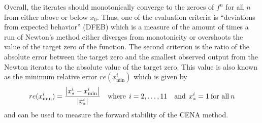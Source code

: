 \documentclass{standalone}
\begin{document}
	Overall, the iterates should monotonically converge to the zeroes of $f^{n}$ for all $n$ from either above or below $x_{0}$. Thus, one of the evaluation criteria is ``deviations from expected behavior'' (DFEB) which is a measure of the amount of times a run of Newton's method either diverges from monotonicity or overshoots the value of the target zero of the function. The second criterion is the ratio of the absolute error between the target zero and the smallest observed output from the Newton iterates to the absolute value of the target zero. This value is also known as the minimum relative error $re(x_{\min}^{i})$ which is given by$$re(x_{\min}^{i})=\frac{\left|x_{*}^{i}-x_{\min}^{i}\right|}{\left|x_{*}^{i}\right|}\quad\text{where}\:\:i=2,\dots,11\quad\text{and}\:\:x_{*}^{i}=1\:\text{for all}\:n$$and can be used to measure the forward stability of the CENA method.
\end{document}
